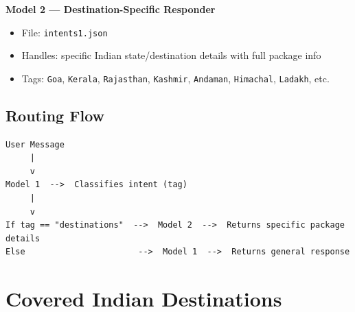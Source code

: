 \documentclass[12pt,a4paper]{article}
\newcommand{\file}[1]{\texttt{\textcolor{travayagreen}{#1}}}
\newcommand{\tag}[1]{\texttt{#1}}
\begin{document}
\vspace{6pt}
\textbf{Model 2 --- Destination-Specific Responder}
\begin{itemize}[noitemsep]
  \item File: \file{intents1.json}
  \item Handles: specific Indian state/destination details with full package info
  \item Tags: \tag{Goa}, \tag{Kerala}, \tag{Rajasthan}, \tag{Kashmir}, \tag{Andaman}, \tag{Himachal}, \tag{Ladakh}, etc.
\end{itemize}

\subsection{Routing Flow}

\begin{lstlisting}
User Message
     |
     v
Model 1  -->  Classifies intent (tag)
     |
     v
If tag == "destinations"  -->  Model 2  -->  Returns specific package details
Else                       -->  Model 1  -->  Returns general response
\end{lstlisting}

\section{Covered Indian Destinations}
\end{document}
